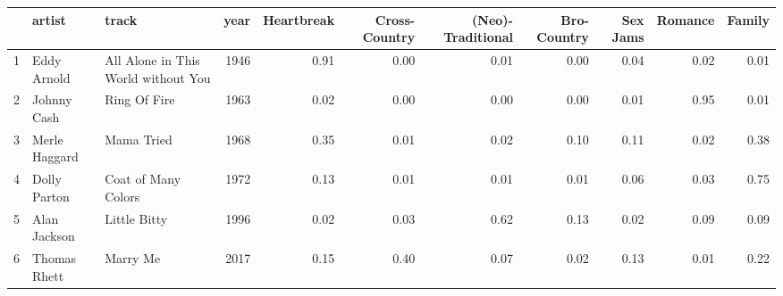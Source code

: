 \begin{table}[ht]
\centering
\begin{tabular}{rllrrrrrrrr}
  \hline
 & artist & track & year & Heartbreak & Cross-Country & (Neo)-Traditional & Bro-Country & Sex Jams & Romance & Family \\ 
  \hline
1 & Eddy Arnold & All Alone in This World without You & 1946 & 0.91 & 0.00 & 0.01 & 0.00 & 0.04 & 0.02 & 0.01 \\ 
  2 & Johnny Cash & Ring Of Fire & 1963 & 0.02 & 0.00 & 0.00 & 0.00 & 0.01 & 0.95 & 0.01 \\ 
  3 & Merle Haggard & Mama Tried & 1968 & 0.35 & 0.01 & 0.02 & 0.10 & 0.11 & 0.02 & 0.38 \\ 
  4 & Dolly Parton & Coat of Many Colors & 1972 & 0.13 & 0.01 & 0.01 & 0.01 & 0.06 & 0.03 & 0.75 \\ 
  5 & Alan Jackson & Little Bitty & 1996 & 0.02 & 0.03 & 0.62 & 0.13 & 0.02 & 0.09 & 0.09 \\ 
  6 & Thomas Rhett & Marry Me & 2017 & 0.15 & 0.40 & 0.07 & 0.02 & 0.13 & 0.01 & 0.22 \\ 
   \hline
\end{tabular}
\end{table}
